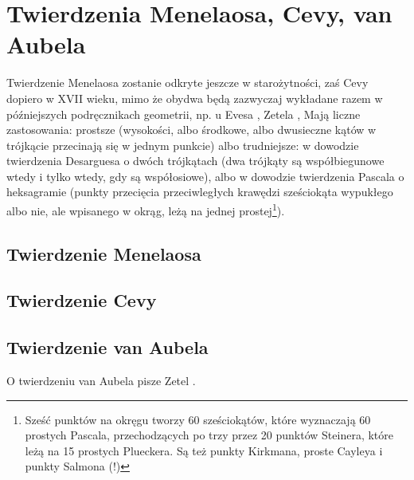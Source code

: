 
%

\section{Twierdzenia Menelaosa, Cevy, van Aubela}
Twierdzenie Menelaosa zostanie odkryte jeszcze w starożytności, zaś Cevy dopiero w XVII wieku, mimo że obydwa będą zazwyczaj wykładane razem w późniejszych podręcznikach geometrii, np. u Evesa \cite[s. 63-67]{eves1_1972}, Zetela \cite[s. 13, 43]{zetel_2020},
Mają liczne zastosowania:
prostsze (wysokości, albo środkowe, albo dwusieczne kątów w trójkącie przecinają się w jednym punkcie) albo trudniejsze:
w dowodzie twierdzenia Desarguesa o dwóch trójkątach (dwa trójkąty są współbiegunowe wtedy i tylko wtedy, gdy są współosiowe), %
albo w dowodzie twierdzenia Pascala o heksagramie (punkty przecięcia przeciwległych krawędzi sześciokąta wypukłego albo nie, ale wpisanego w okrąg, leżą na jednej prostej\footnote{Sześć punktów na okręgu tworzy 60 sześciokątów, które wyznaczają 60 prostych Pascala, przechodzących po trzy przez 20 punktów Steinera, które leżą na 15 prostych Plueckera. Są też punkty Kirkmana, proste Cayleya i punkty Salmona (!)}). %


\subsection{Twierdzenie Menelaosa}

\subsection{Twierdzenie Cevy}
 

\subsection{Twierdzenie van Aubela}
O twierdzeniu van Aubela pisze Zetel \cite[s. 24]{zetel_2020}.


